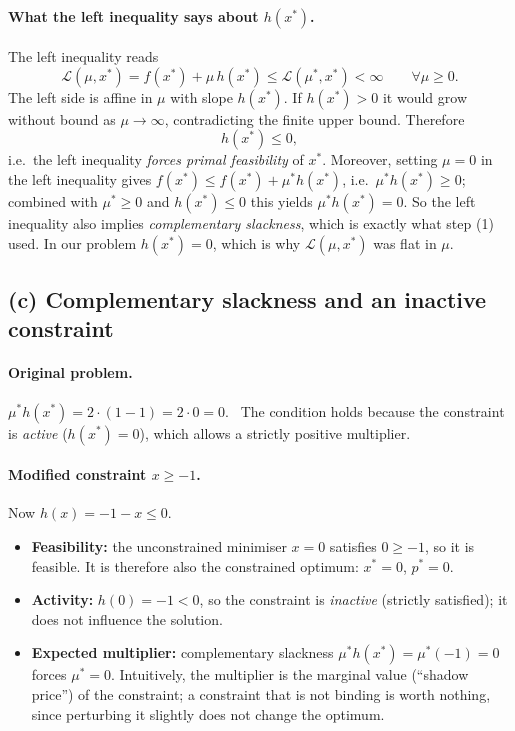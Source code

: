 \documentclass[11pt,a4paper]{article}
\newcommand{\Lag}{\mathcal{L}}
\begin{document}
\paragraph{What the left inequality says about $h(x^\ast)$.} The left inequality reads
\[
  \Lag(\mu,x^\ast)=f(x^\ast)+\mu\,h(x^\ast)\le\Lag(\mu^\ast,x^\ast)<\infty\qquad\forall\mu\ge0.
\]
The left side is affine in $\mu$ with slope $h(x^\ast)$. If $h(x^\ast)>0$ it would grow without bound as $\mu\to\infty$, contradicting the finite upper bound. Therefore
\[
  h(x^\ast)\le0,
\]
i.e.\ the left inequality \emph{forces primal feasibility} of $x^\ast$. Moreover, setting $\mu=0$ in the left inequality gives $f(x^\ast)\le f(x^\ast)+\mu^\ast h(x^\ast)$, i.e.\ $\mu^\ast h(x^\ast)\ge0$; combined with $\mu^\ast\ge0$ and $h(x^\ast)\le0$ this yields $\mu^\ast h(x^\ast)=0$. So the left inequality also implies \emph{complementary slackness}, which is exactly what step (1) used. In our problem $h(x^\ast)=0$, which is why $\Lag(\mu,x^\ast)$ was flat in $\mu$.

\subsection{(c) Complementary slackness and an inactive constraint}

\paragraph{Original problem.} $\mu^\ast h(x^\ast)=2\cdot(1-1)=2\cdot0=0$. \checkmark\ The condition holds because the constraint is \emph{active} ($h(x^\ast)=0$), which allows a strictly positive multiplier.

\paragraph{Modified constraint $x\ge-1$.} Now $h(x)=-1-x\le0$.
\begin{itemize}
  \item \textbf{Feasibility:} the unconstrained minimiser $x=0$ satisfies $0\ge-1$, so it is feasible. It is therefore also the constrained optimum: $x^\ast=0$, $p^\ast=0$.
  \item \textbf{Activity:} $h(0)=-1<0$, so the constraint is \emph{inactive} (strictly satisfied); it does not influence the solution.
  \item \textbf{Expected multiplier:} complementary slackness $\mu^\ast h(x^\ast)=\mu^\ast(-1)=0$ forces $\boxed{\mu^\ast=0}$. Intuitively, the multiplier is the marginal value (``shadow price'') of the constraint; a constraint that is not binding is worth nothing, since perturbing it slightly does not change the optimum.
\end{itemize}
\end{document}
